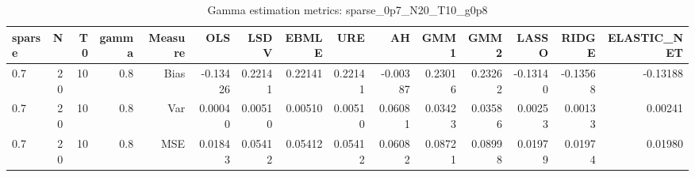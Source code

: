 \begin{table}[!htbp]\centering
\caption{Gamma estimation metrics: sparse_0p7_N20_T10_g0p8}
\label{tab:table1_sparse_0p7_N20_T10_g0p8}
\begin{tabular}{lrrrrrrrrrrrrrr}
\hline
sparse & N & T0 & gamma & Measure & OLS & LSDV & EBMLE & URE & AH & GMM1 & GMM2 & LASSO & RIDGE & ELASTIC_NET \\
\hline
0.7 & 20 & 10 & 0.8 & Bias & -0.13426 & 0.22141 & 0.22141 & 0.22141 & -0.00387 & 0.23016 & 0.23262 & -0.13140 & -0.13568 & -0.13188 \\
0.7 & 20 & 10 & 0.8 & Var & 0.00040 & 0.00510 & 0.00510 & 0.00510 & 0.06081 & 0.03423 & 0.03586 & 0.00253 & 0.00133 & 0.00241 \\
0.7 & 20 & 10 & 0.8 & MSE & 0.01843 & 0.05412 & 0.05412 & 0.05412 & 0.06082 & 0.08721 & 0.08998 & 0.01979 & 0.01974 & 0.01980 \\
\hline
\end{tabular}
\end{table}

